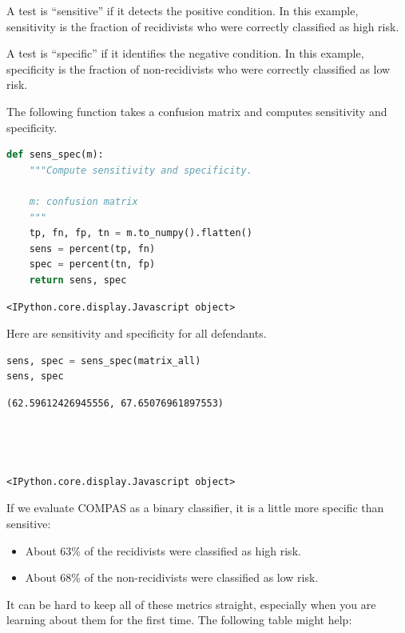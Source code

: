 A test is ``sensitive'' if it detects the positive condition. In this
example, sensitivity is the fraction of recidivists who were correctly
classified as high risk.

A test is ``specific'' if it identifies the negative condition. In this
example, specificity is the fraction of non-recidivists who were
correctly classified as low risk.

The following function takes a confusion matrix and computes sensitivity
and specificity.

\begin{lstlisting}[language=Python,style=source]
def sens_spec(m):
    """Compute sensitivity and specificity.

    m: confusion matrix
    """
    tp, fn, fp, tn = m.to_numpy().flatten()
    sens = percent(tp, fn)
    spec = percent(tn, fp)
    return sens, spec
\end{lstlisting}

\begin{lstlisting}[style=output]
<IPython.core.display.Javascript object>
\end{lstlisting}

Here are sensitivity and specificity for all defendants.

\begin{lstlisting}[language=Python,style=source]
sens, spec = sens_spec(matrix_all)
sens, spec
\end{lstlisting}

\begin{lstlisting}[style=output]
(62.59612426945556, 67.65076961897553)




<IPython.core.display.Javascript object>
\end{lstlisting}

If we evaluate COMPAS as a binary classifier, it is a little more
specific than sensitive:

\begin{itemize}
\item
  About 63\% of the recidivists were classified as high risk.
\item
  About 68\% of the non-recidivists were classified as low risk.
\end{itemize}

It can be hard to keep all of these metrics straight, especially when
you are learning about them for the first time. The following table
might help:

